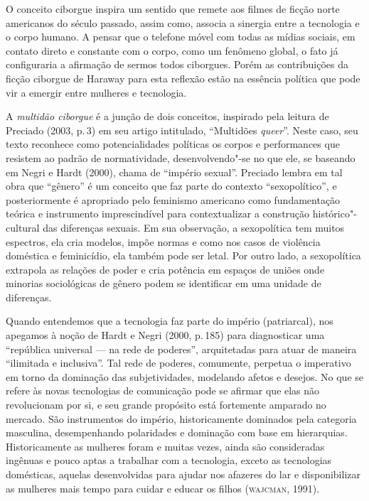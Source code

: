 O conceito ciborgue inspira um sentido que remete aos filmes de ficção
norte americanos do século passado, assim como, associa a sinergia entre
a tecnologia e o corpo humano. A pensar que o telefone móvel com todas
as mídias sociais, em contato direto e constante com o corpo, como um
fenômeno global, o fato já configuraria a afirmação de sermos todos
ciborgues. Porém as contribuições da ficção ciborgue de Haraway para
esta reflexão estão na essência política que pode vir a emergir entre
mulheres e tecnologia.

A \textit{multidão ciborgue} é a junção de dois conceitos, inspirado pela
leitura de Preciado (2003, p.\,3) em seu artigo intitulado, ``Multidões
\textit{queer}''. Neste caso, seu texto reconhece como potencialidades políticas
os corpos e performances que resistem ao padrão de normatividade,
desenvolvendo"-se no que ele, se baseando em Negri e Hardt (2000), chama
de ``império sexual''. Preciado lembra em tal obra que ``gênero'' é um
conceito que faz parte do contexto ``sexopolítico'', e posteriormente é
apropriado pelo feminismo americano como fundamentação teórica e
instrumento imprescindível para contextualizar a construção
histórico"-cultural das diferenças sexuais. Em sua observação, a
sexopolítica tem muitos espectros, ela cria modelos, impõe normas e como
nos casos de violência doméstica e feminicídio, ela também pode ser
letal. Por outro lado, a sexopolítica extrapola as relações de poder e
cria potência em espaços de uniões onde minorias sociológicas de gênero
podem se identificar em uma unidade de diferenças.

Quando entendemos que a tecnologia faz parte do império (patriarcal),
nos apegamos à noção de Hardt e Negri (2000, p.\,185) para diagnosticar
uma ``república universal --- na rede de poderes'', arquitetadas para
atuar de maneira ``ilimitada e inclusiva''. Tal rede de poderes,
comumente, perpetua o imperativo em torno da dominação das
subjetividades, modelando afetos e desejos. No que se refere às novas
tecnologias de comunicação pode se afirmar que elas não revolucionam por
si, e seu grande propósito está fortemente amparado no mercado. São
instrumentos do império, historicamente dominados pela categoria
masculina, desempenhando polaridades e dominação com base em
hierarquias. Historicamente as mulheres foram e muitas vezes, ainda são
consideradas ingênuas e pouco aptas a trabalhar com a tecnologia, exceto
as tecnologias domésticas, aquelas desenvolvidas para ajudar nos
afazeres do lar e disponibilizar as mulheres mais tempo para cuidar e
educar os filhos (\textsc{wajcman}, 1991).

